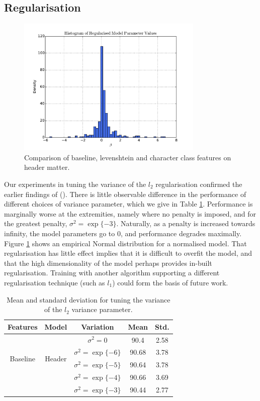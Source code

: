 \subsection{Regularisation}

\begin{figure}[h]
\center
\includegraphics[width=3.5in]{Figures/histogram.pdf}
\caption{Comparison of baseline, levenshtein and character class features on header matter.}
\label{fig:histogram}
\end{figure}

Our experiments in tuning the variance of the $l_2$ regularisation confirmed the earlier findings of (\cite{Peng04accurateinformation}). There is little observable difference in the performance of different choices of variance parameter, which we give in Table \ref{table:regularisationresults}. Performance is marginally worse at the extremities, namely where no penalty is imposed, and for the greatest penalty, $\sigma^2 = \exp\{-3\}$. Naturally, as a penalty is increased towards infinity, the model parameters go to 0, and performance degrades maximally. Figure \ref{fig:histogram} shows an empirical Normal distribution for a normalised model. That regularisation has little effect implies that it is difficult to overfit the model, and that the high dimensionality of the model perhaps provides in-built regularisation. Training with another algorithm supporting a different regularisation technique (such as $l_1$) could form the basis of future work.

\begin{table}[h]
\begin{center}
\begin{tabular}{|c|c|c|c|c|}
\hline
Features & Model & Variation & Mean & Std.\\
\hline
\multirow{4}{*}{Baseline} & \multirow{4}{*}{Header} & $\sigma^2 = 0$ & 90.4 & 2.58\\
& & $\sigma^2 = \exp\{-6\}$ & 90.68 & 3.78\\
& & $\sigma^2 = \exp\{-5\}$ & 90.64 & 3.78\\
& & $\sigma^2 = \exp\{-4\}$ & 90.66 & 3.69\\
& & $\sigma^2 = \exp\{-3\}$ & 90.44 & 2.77\\
\hline
\end{tabular}
\caption[Mean and standard deviation for tuning the variance of the $l_2$ variance parameter.]{Mean and standard deviation for tuning the variance of the $l_2$ variance parameter.}
\label{table:regularisationresults}
\end{center}
\end{table}


